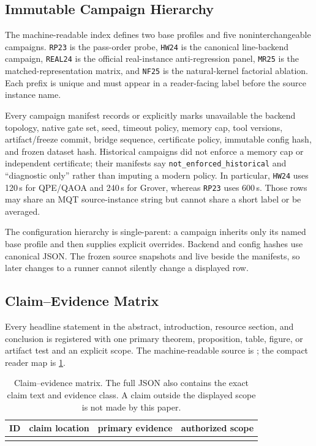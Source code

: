\subsection{Immutable Campaign Hierarchy}

The machine-readable index
 defines two base
profiles and five noninterchangeable campaigns.  \texttt{RP23} is the
pass-order probe, \texttt{HW24} is the canonical line-backend campaign,
\texttt{REAL24} is the official real-instance anti-regression panel,
\texttt{MR25} is the matched-representation matrix, and \texttt{NF25} is the
natural-kernel factorial ablation.  Each prefix is unique and must appear in a
reader-facing label before the source instance name.

Every campaign manifest records or explicitly marks unavailable the backend
topology, native gate set, seed, timeout policy, memory cap, tool versions,
artifact/freeze commit, bridge sequence, certificate policy, immutable config
hash, and frozen dataset hash.  Historical campaigns did not enforce a memory
cap or independent certificate; their manifests say
\texttt{not\_enforced\_historical} and ``diagnostic only'' rather than imputing
a modern policy.  In particular, \texttt{HW24} uses 120\,s for QPE/QAOA and
240\,s for Grover, whereas \texttt{RP23} uses 600\,s.  Those rows may share an
MQT source-instance string but cannot share a short label or be averaged.

The configuration hierarchy is single-parent: a campaign inherits only its
named base profile and then supplies explicit overrides.  Backend and config
hashes use canonical JSON.  The frozen source snapshots
 and
 live beside the manifests, so later changes
to a runner cannot silently change a displayed row.

\subsection{Claim--Evidence Matrix}

Every headline statement in the abstract, introduction, resource section, and
conclusion is registered with one primary theorem, proposition, table, figure,
or artifact test and an explicit scope.  The machine-readable source is
; the compact reader map is
\cref{tab:claim-evidence}.

\begin{table}[tbp]
\centering
\scriptsize
\begin{tabularx}{\textwidth}{@{}l l l X@{}}
\toprule
ID & claim location & primary evidence & authorized scope \\
\midrule
 \\
\bottomrule
\end{tabularx}
\caption{Claim--evidence matrix.  The full JSON also contains the exact claim
text and evidence class.  A claim outside the displayed scope is not made by
this paper.}
\label{tab:claim-evidence}
\end{table}
